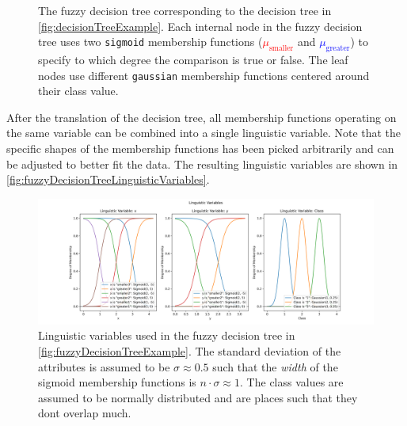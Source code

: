 \begin{figure}[h]

    \caption[Fuzzy decision tree created from the regular decision tree]{The fuzzy decision tree corresponding to the decision tree in \autoref{fig:decisionTreeExample}. Each internal node in the fuzzy decision tree uses two \texttt{sigmoid} membership functions (\textcolor{red}{$\mu_{\text{smaller}}$} and \textcolor{blue}{$\mu_{\text{greater}}$}) to specify to which degree the comparison is true or false. The leaf nodes use different \texttt{gaussian} membership functions centered around their class value.}

    \label{fig:fuzzyDecisionTreeExample}
\end{figure}

After the translation of the decision tree, all membership functions operating on the same variable can be combined into a single linguistic variable. Note that the specific shapes of the membership functions has been picked arbitrarily and can be adjusted to better fit the data. The resulting linguistic variables are shown in \autoref{fig:fuzzyDecisionTreeLinguisticVariables}.

\begin{figure}[H]
    \centering

    \includegraphics[width=\linewidth,trim={3.5cm 0 3.5cm 1cm},clip]{figures/ProofOfConcepts/fuzzy_sets.png}

    \caption[Linguistic variables for the converted fuzzy decision tree]{Linguistic variables used in the fuzzy decision tree in \autoref{fig:fuzzyDecisionTreeExample}. The standard deviation of the attributes is assumed to be $\sigma \approx 0.5$ such that the \emph{width} of the sigmoid membership functions is $n\cdot \sigma \approx 1$. The class values are assumed to be normally distributed and are places such that they dont overlap much.}
    \label{fig:fuzzyDecisionTreeLinguisticVariables}
\end{figure}

